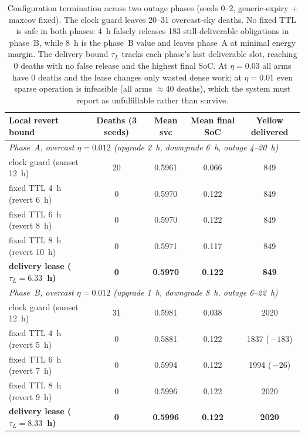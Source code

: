\documentclass[11pt]{article}
\begin{document}
\begin{table}[h]
\centering\small
\begin{tabular}{lcccc}
\toprule
Local revert bound & Deaths (3 seeds) & Mean svc & Mean final SoC & Yellow delivered\\
\midrule
\multicolumn{5}{l}{\emph{Phase~A, overcast $\eta{=}0.012$ (upgrade 2~h, downgrade 6~h, outage 4--20~h)}}\\
clock guard (sunset 12~h) & 20 & 0.5961 & 0.066 & 849\\
fixed TTL 4~h (revert 6~h) & 0 & 0.5970 & 0.122 & 849\\
fixed TTL 6~h (revert 8~h) & 0 & 0.5970 & 0.122 & 849\\
fixed TTL 8~h (revert 10~h) & 0 & 0.5971 & 0.117 & 849\\
\textbf{delivery lease ($\tau_L{=}6.33$~h)} & \textbf{0} & \textbf{0.5970} & \textbf{0.122} & \textbf{849}\\
\midrule
\multicolumn{5}{l}{\emph{Phase~B, overcast $\eta{=}0.012$ (upgrade 1~h, downgrade 8~h, outage 6--22~h)}}\\
clock guard (sunset 12~h) & 31 & 0.5981 & 0.038 & 2020\\
fixed TTL 4~h (revert 5~h) & 0 & 0.5881 & 0.122 & 1837 (\,$-183$)\\
fixed TTL 6~h (revert 7~h) & 0 & 0.5994 & 0.122 & 1994 (\,$-26$)\\
fixed TTL 8~h (revert 9~h) & 0 & 0.5996 & 0.122 & 2020\\
\textbf{delivery lease ($\tau_L{=}8.33$~h)} & \textbf{0} & \textbf{0.5996} & \textbf{0.122} & \textbf{2020}\\
\bottomrule
\end{tabular}
\caption{Configuration termination across two outage phases (seeds 0--2, generic-expiry + maxcov
fixed). The clock guard leaves 20--31 overcast-sky deaths. No fixed TTL is safe in both phases:
4~h falsely releases 183 still-deliverable obligations in phase~B, while 8~h is the phase~B value
and leaves phase~A at minimal energy margin. The delivery bound $\tau_L$ tracks each phase's last
deliverable slot, reaching 0 deaths with no false release and the highest final SoC. At
$\eta{=}0.03$ all arms have 0 deaths and the lease changes only wasted dense work; at
$\eta{=}0.01$ even sparse operation is infeasible (all arms $\approx$40 deaths), which the system
must report as unfulfillable rather than survive.}
\label{tab:lease}
\end{table}
\end{document}
